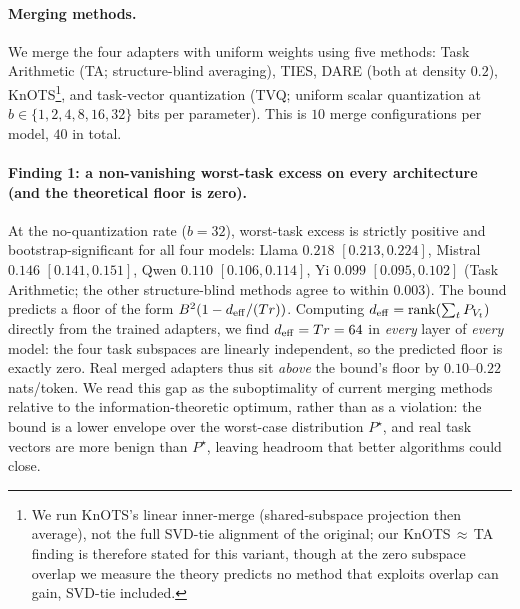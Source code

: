 \paragraph{Merging methods.} We merge the four adapters with
uniform weights using five methods: Task Arithmetic (TA;
structure-blind averaging), TIES, DARE (both at density $0.2$),
KnOTS\footnote{We run KnOTS's linear inner-merge (shared-subspace
projection then average), not the full SVD-tie alignment of the
original; our KnOTS$\,\approx\,$TA finding is therefore stated for this
variant, though at the zero subspace overlap we measure the theory
predicts no method that exploits overlap can gain, SVD-tie included.},
and task-vector quantization (TVQ;
uniform scalar quantization at $b \in \{1,2,4,8,16,32\}$ bits
per parameter). This is $10$ merge configurations per model,
$40$ in total.

\paragraph{Finding 1: a non-vanishing worst-task excess on every
architecture (and the theoretical floor is zero).}
At the no-quantization rate ($b=32$), worst-task excess is
strictly positive and bootstrap-significant for all four models:
Llama $0.218$ $[0.213, 0.224]$, Mistral $0.146$ $[0.141, 0.151]$,
Qwen $0.110$ $[0.106, 0.114]$, Yi $0.099$ $[0.095, 0.102]$
(Task Arithmetic; the other structure-blind methods agree to
within $0.003$). The bound predicts a floor of the form
$B^2(1 - d_{\mathrm{eff}}/(Tr))$. Computing $d_{\mathrm{eff}} = \operatorname{rank}(\sum_t P_{V_t})$
directly from the trained adapters, we find $d_{\mathrm{eff}} = Tr = 64$ in
\emph{every} layer of \emph{every} model: the four task subspaces
are linearly independent, so the predicted floor is exactly zero.
Real merged adapters thus sit \emph{above} the bound's
floor by $0.10$--$0.22$ nats/token. We read this gap as the
suboptimality of current merging methods relative to the
information-theoretic optimum, rather than as a violation: the
bound is a lower envelope over the worst-case distribution
$P^\star$, and real task vectors are more benign than $P^\star$,
leaving headroom that better algorithms could close.

